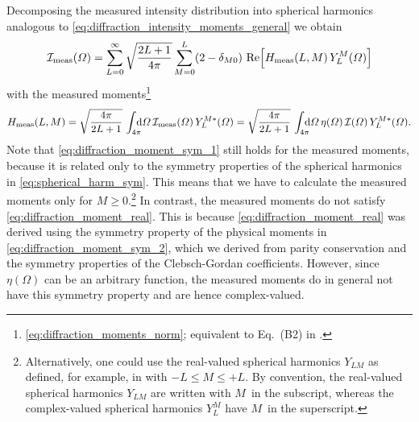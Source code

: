 Decomposing the measured intensity distribution into spherical
harmonics analogous to \cref{eq:diffraction_intensity_moments_general}
we obtain
\begin{equation}
  \label{eq:diffraction_intensity_moments_meas}
  \intensity_\text{meas}(\Omega)
  = \sum_{L = 0}^\infty \sqrt{\frac{2 L + 1}{4 \pi}} \sum_{M = 0}^{L} (2 - \delta_{M 0})\, \Re{H_\text{meas}(L, M)\, Y_L^M(\Omega)}
\end{equation}
with the measured
moments\footnote{\Confer
\cref{eq:diffraction_moments_norm}; equivalent to Eq.~(B2) in
.}
\begin{equation}
  \label{eq:diffraction_moments_meas}
  H_\text{meas}(L, M)
  = \sqrt{\frac{4 \pi}{2 L + 1}}\, \int_{4 \pi}\!\!\!\! \dif{\Omega}\, \intensity_\text{meas}(\Omega)\, Y_L^{M *}(\Omega)
  = \sqrt{\frac{4 \pi}{2 L + 1}}\, \int_{4 \pi}\!\!\!\! \dif{\Omega}\, \eta(\Omega)\, \intensity(\Omega)\, Y_L^{M *}(\Omega).
\end{equation}
Note that \cref{eq:diffraction_moment_sym_1} still holds for the
measured moments, because it is related only to the symmetry
properties of the spherical harmonics in \cref{eq:spherical_harm_sym}.
This means that we have to calculate the measured moments only for $M
\geq
0$.\footnote{\label{fn:real_valued_spherical_harmonics}Alternatively,
one could use the real-valued spherical harmonics $Y_{L M}$ as
defined, for example, in 
with $-L \leq M \leq +L$.  By convention, the real-valued spherical
harmonics $Y_{L M}$ are written with $M$~in the subscript, whereas the
complex-valued spherical harmonics $Y_L^M$ have $M$~in the
superscript.}  In contrast, the measured moments do not satisfy
\cref{eq:diffraction_moment_real}.  This is because
\cref{eq:diffraction_moment_real} was derived using the symmetry
property of the physical moments in
\cref{eq:diffraction_moment_sym_2}, which we derived from parity
conservation and the symmetry properties of the Clebsch-Gordan
coefficients.  However, since $\eta(\Omega)$ can be an arbitrary
function, the measured moments do in general not have this symmetry
property and are hence complex-valued.


